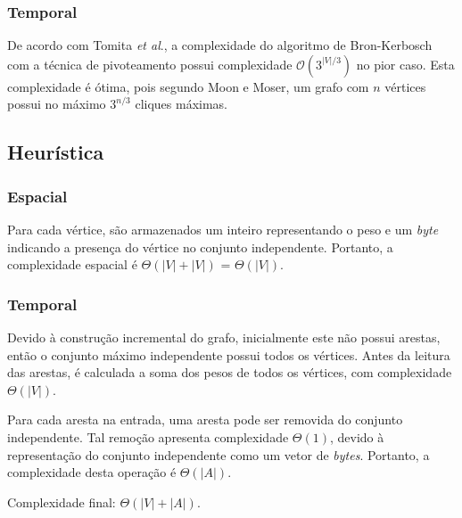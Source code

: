 \documentclass{article}
\begin{document}
\subsubsection{Temporal}
De acordo com Tomita \textit{et al}.\cite{TOMITA200628}, a complexidade do algoritmo de Bron-Kerbosch com a técnica de \mbox{pivoteamento} possui complexidade $\mathcal{O}(3^{|V|/3})$ no pior caso. Esta complexidade é ótima, pois segundo Moon e Moser\cite{Moon1965}, um grafo com $n$ vértices possui no máximo $3^{n/3}$ cliques máximas.

\subsection{Heurística}
\subsubsection{Espacial}
Para cada vértice, são armazenados um inteiro representando o peso e um \textit{byte} indicando a presença do vértice no conjunto independente. Portanto, a complexidade espacial é $\Theta(|V| + |V|)$ = $\Theta(|V|)$.
\subsubsection{Temporal}
Devido à construção incremental do grafo, inicialmente este não possui arestas, então o conjunto máximo independente possui todos os vértices. Antes da leitura das arestas, é calculada a soma dos pesos de todos os vértices, com complexidade $\Theta(|V|)$.

Para cada aresta na entrada, uma aresta pode ser removida do conjunto independente. Tal remoção apresenta complexidade $\Theta(1)$, devido à representação do conjunto independente como um vetor de \textit{bytes}. Portanto, a complexidade desta operação é $\Theta(|A|)$.

Complexidade final: $\Theta(|V| + |A|)$.


\pagebreak
\end{document}
